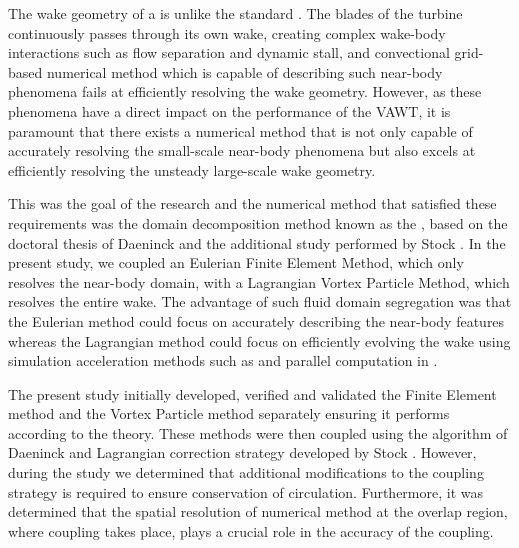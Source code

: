 	The wake geometry of a  is unlike the standard . The blades of the turbine continuously passes through its own wake, creating complex wake-body interactions such as flow separation and dynamic stall, and convectional grid-based numerical method which is capable of describing such near-body phenomena fails at efficiently resolving the wake geometry. However, as these phenomena have a direct impact on the performance of the VAWT, it is paramount that there exists a numerical method that is not only capable of accurately resolving the small-scale near-body phenomena but also excels at efficiently resolving the unsteady large-scale wake geometry.
		
	
	
	This was the goal of the research and the numerical method that satisfied these requirements was the domain decomposition method known as the , based on the doctoral thesis of Daeninck \cite{Daeninck2006} and the additional study performed by Stock \cite{Stock2010a}. In the present study, we coupled an Eulerian Finite Element Method, which only resolves the near-body domain, with a Lagrangian Vortex Particle Method, which resolves the entire wake. The advantage of such fluid domain segregation was that the Eulerian method could focus on accurately describing the near-body features whereas the Lagrangian method could focus on efficiently evolving the wake using simulation acceleration methods such as  and parallel computation in . 
	

	The present study initially developed, verified and validated the Finite Element method and the Vortex Particle method separately ensuring it performs according to the theory. These methods were then coupled using the algorithm of Daeninck \cite{Daeninck2006} and Lagrangian correction strategy developed by Stock \cite{Stock2010a}. However, during the study we determined that additional modifications to the coupling strategy is required to ensure conservation of circulation. Furthermore, it was determined that the spatial resolution of numerical method at the overlap region, where coupling takes place, plays a crucial role in the accuracy of the coupling. 
	
